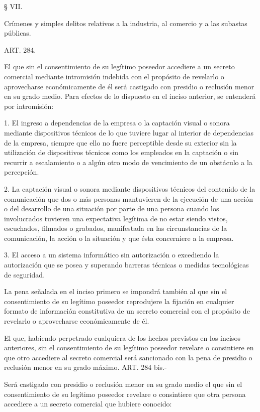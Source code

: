     § VII.

    Crímenes y simples delitos relativos a la industria, al comercio y a las subastas públicas.





    ART. 284.

    El que sin el consentimiento de su legítimo poseedor accediere a un secreto comercial mediante intromisión indebida con el propósito de revelarlo o aprovecharse económicamente de él será castigado con presidio o reclusión menor en su grado medio.
    Para efectos de lo dispuesto en el inciso anterior, se entenderá por intromisión:

    1. El ingreso a dependencias de la empresa o la captación visual o sonora mediante dispositivos técnicos de lo que tuviere lugar al interior de dependencias de la empresa, siempre que ello no fuere perceptible desde su exterior sin la utilización de dispositivos técnicos como los empleados en la captación o sin recurrir a escalamiento o a algún otro modo de vencimiento de un obstáculo a la percepción.

    2. La captación visual o sonora mediante dispositivos técnicos del contenido de la comunicación que dos o más personas mantuvieren de la ejecución de una acción o del desarrollo de una situación por parte de una persona cuando los involucrados tuvieren una expectativa legítima de no estar siendo vistos, escuchados, filmados o grabados, manifestada en las circunstancias de la comunicación, la acción o la situación y que ésta concerniere a la empresa.

    3. El acceso a un sistema informático sin autorización o excediendo la autorización que se posea y superando barreras técnicas o medidas tecnológicas de seguridad.

    La pena señalada en el inciso primero se impondrá también al que sin el consentimiento de su legítimo poseedor reprodujere la fijación en cualquier formato de información constitutiva de un secreto comercial con el propósito de revelarlo o aprovecharse económicamente de él.

    El que, habiendo perpetrado cualquiera de los hechos previstos en los incisos anteriores, sin el consentimiento de su legítimo poseedor revelare o consintiere en que otro accediere al secreto comercial será sancionado con la pena de presidio o reclusión menor en su grado máximo.
    ART. 284 bis.-

    Será castigado con presidio o reclusión menor en su grado medio el que sin el consentimiento de su legítimo poseedor revelare o consintiere que otra persona accediere a un secreto comercial que hubiere conocido:

